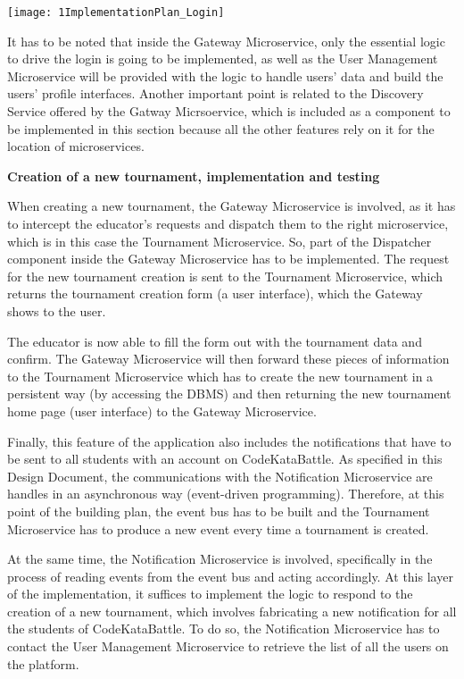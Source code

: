 \begin{center}
	\texttt{[image: 1ImplementationPlan\_Login]}
\end{center}


It has to be noted that inside the Gateway Microservice, only the essential logic to drive the login is going to be implemented, as well as the User Management Microservice will be provided with the logic to handle users' data and build the users' profile interfaces.
Another important point is related to the Discovery Service offered by the Gatway Micrsoervice, which is included as a component to be implemented in this section because all the other features rely on it for the location of microservices.


\textbf{Creation of a new tournament, implementation and testing}

When creating a new tournament, the Gateway Microservice is involved, as it has to intercept the educator's requests and dispatch them to the right microservice, which is in this case the Tournament Microservice. So, part of the Dispatcher component inside the Gateway Microservice has to be implemented. 
The request for the new tournament creation is sent to the Tournament Microservice, which returns the tournament creation form (a user interface), which the Gateway shows to the user.

The educator is now able to fill the form out with the tournament data and confirm. The Gateway Microservice will then forward these pieces of information to the Tournament Microservice which has to create the new tournament in a persistent way (by accessing the DBMS) and then returning the new tournament home page (user interface) to the Gateway Microservice.

Finally, this feature of the application also includes the notifications that have to be sent to all students with an account on CodeKataBattle. As specified in this Design Document, the communications with the Notification Microservice  are handles in an asynchronous way (event-driven programming). Therefore, at this point of the building plan, the event bus has to be built and the Tournament Microservice has to produce a new event every time a tournament is created. 

At the same time, the Notification Microservice is involved, specifically in the process of reading events from the event bus and acting accordingly. At this layer of the implementation, it suffices to implement the logic to respond to the creation of a new tournament, which involves fabricating a new notification for all the students of CodeKataBattle. To do so, the Notification Microservice has to contact the User Management Microservice to retrieve the list of all the users on the platform.

